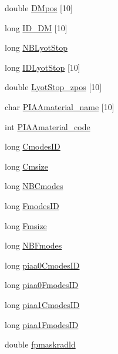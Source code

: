 \begin{DoxyCompactItemize}
\item 
double \hyperlink{structOPTPIAACMCDESIGN_ad508d17e469e18e4d2d8034bf0f23ea6}{D\+Mpos} \mbox{[}10\mbox{]}
\item 
long \hyperlink{structOPTPIAACMCDESIGN_a01002138c2aeb8f60ce18ab70bac6a15}{I\+D\+\_\+\+D\+M} \mbox{[}10\mbox{]}
\item 
long \hyperlink{structOPTPIAACMCDESIGN_aacf0223dec146b41ded13305b83c8ba6}{N\+B\+Lyot\+Stop}
\item 
long \hyperlink{structOPTPIAACMCDESIGN_a58b78571969e6a7a7d33a1439f264889}{I\+D\+Lyot\+Stop} \mbox{[}10\mbox{]}
\item 
double \hyperlink{structOPTPIAACMCDESIGN_ac58466d4fb98041f6a1279ce0e1092b1}{Lyot\+Stop\+\_\+zpos} \mbox{[}10\mbox{]}
\item 
char \hyperlink{structOPTPIAACMCDESIGN_abf3280f1ad15a23b5cf9f05942ca6d69}{P\+I\+A\+Amaterial\+\_\+name} \mbox{[}10\mbox{]}
\item 
int \hyperlink{structOPTPIAACMCDESIGN_a9fc6f0b8de4e0e7fe0694cd8f4e827e1}{P\+I\+A\+Amaterial\+\_\+code}
\item 
long \hyperlink{structOPTPIAACMCDESIGN_a34261c3f4264eb64be04cacd186aa1fc}{Cmodes\+I\+D}
\item 
long \hyperlink{structOPTPIAACMCDESIGN_a0943c7f88d6cc19f0d93aec976c33abf}{Cmsize}
\item 
long \hyperlink{structOPTPIAACMCDESIGN_a8206d0c4c019d9c2a6dda4d22cf7d8a6}{N\+B\+Cmodes}
\item 
long \hyperlink{structOPTPIAACMCDESIGN_a6b13c1628f90db964d8279de9aee4f23}{Fmodes\+I\+D}
\item 
long \hyperlink{structOPTPIAACMCDESIGN_a0e84939f7dbafe942bc7725bd6ddfa8e}{Fmsize}
\item 
long \hyperlink{structOPTPIAACMCDESIGN_ac46c632c680659b8c588701a497dbb4b}{N\+B\+Fmodes}
\item 
long \hyperlink{structOPTPIAACMCDESIGN_a9b381fe9d31e74c5306577c8ca59116b}{piaa0\+Cmodes\+I\+D}
\item 
long \hyperlink{structOPTPIAACMCDESIGN_a9101237f5e1b7af8a40014685cb399b9}{piaa0\+Fmodes\+I\+D}
\item 
long \hyperlink{structOPTPIAACMCDESIGN_aa59c49ac1d770c1ee0e3bce22e4d5863}{piaa1\+Cmodes\+I\+D}
\item 
long \hyperlink{structOPTPIAACMCDESIGN_a5fa43c209dc396f65f2d74d3bb275e75}{piaa1\+Fmodes\+I\+D}
\item 
double \hyperlink{structOPTPIAACMCDESIGN_ad6c571d51ab93c62406a1485713652c1}{fpmaskradld}
\item 

\end{DoxyCompactItemize}
